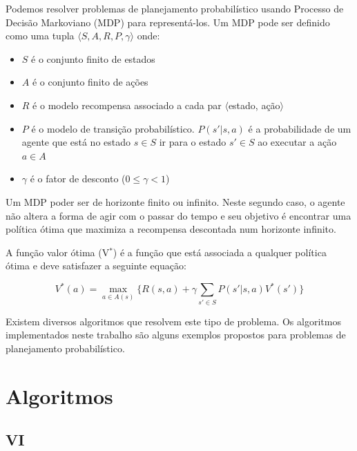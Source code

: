 \documentclass[12pt,a4paper]{article}
\begin{document}
Podemos resolver problemas de planejamento probabilístico usando Processo de Decisão Markoviano (MDP) para representá-los. Um MDP pode ser definido como uma tupla $\langle S, A, R, P, \gamma \rangle$ onde:

\begin{itemize}
  \item $S$ é o conjunto finito de estados
  \item $A$ é o conjunto finito de ações
  \item $R$ é o modelo recompensa associado a cada par $\langle$estado, 
ação$\rangle$
  \item $P$ é o modelo de transição probabilístico. $P(s'|s,a)$ é a probabilidade de um agente que está no estado $s \in S$ ir para o estado $s' \in S$ ao executar a ação $a \in A$
  \item $\gamma$ é o fator de desconto ($0 \leq \gamma < 1$)
\end{itemize}


Um MDP poder ser de horizonte finito ou infinito. Neste segundo caso, o agente não altera  a forma de agir com o passar do tempo e seu objetivo é encontrar uma política ótima que maximiza a recompensa descontada num horizonte infinito.

A função valor ótima (V$^*$) é a função que está associada a qualquer política ótima e deve satisfazer a seguinte equação:

\begin{equation}\label{bellman}
V^*(a) = \max_{a\in A(s)}\{R(s,a) + \gamma \sum\limits_{s'\in S} P(s'|s, a) V^*(s')\}
\end{equation}

Existem diversos algoritmos que resolvem este tipo de problema. Os algoritmos implementados neste trabalho são alguns exemplos propostos para problemas de planejamento probabilístico.








\section{Algoritmos}\label{algoritmos}

\subsection{VI}\label{vi}

\end{document}
